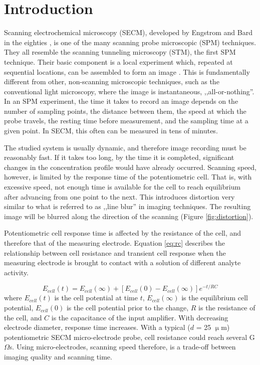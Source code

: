 \documentclass[3p]{elsarticle}
\begin{document}
\section{Introduction}

Scanning electrochemical microscopy (SECM), developed by Engstrom and Bard in the eighties \cite{originalSECM, originalSECM2, originalSECM3}, is one of the many scanning probe microscopic (SPM) techniques. They all resemble the scanning tunneling microscopy (STM), the first SPM technique. Their basic component is a local experiment which, repeated at sequential locations, can be assembled to form an image \cite{stm}. This is fundamentally different from other, non-scanning microscopic techniques, such as the conventional light microscopy, where the image is instantaneous, ,,all-or-nothing''. In an SPM experiment, the time it takes to record an image depends on the number of sampling points, the distance between them, the speed at which the probe travels, the resting time before measurement, and the sampling time at a given point. In SECM, this often can be measured in tens of minutes.

The studied system is usually dynamic, and therefore image recording must be reasonably fast. If it takes too long, by the time it is completed, significant changes in the concentration profile would have already occurred. Scanning speed, however, is limited by the response time of the potentiometric cell. That is, with excessive speed, not enough time is available for the cell to reach equilibrium after advancing from one point to the next. This introduces distortion very similar to what is referred to as ,,line blur'' in imaging techniques. The resulting image will be blurred along the direction of the scanning (Figure \ref{fig:distortion}).

Potentiometric cell response time is affected by the resistance of the cell, and therefore that of the measuring electrode. Equation \ref{eq:rc} describes the relationship between cell resistance and transient cell response when the measuring electrode is brought to contact with a solution of different analyte activity.

\begin{equation}
\label{eq:rc}
	E_{cell}(t) = E_{cell}(\infty) + [E_{cell}(0) - E_{cell}(\infty)]e^{-t/RC}
\end{equation}
where $E_{cell}(t)$ is the cell potential at time $t$, $E_{cell}(\infty)$ is the equilibrium cell potential, $E_{cell}(0)$ is the cell potential prior to the change, $R$ is the resistance of the cell, and $C$ is the capacitance of the input amplifier. With decreasing electrode diameter, response time increases. With a typical ($d$ = 25 $\upmu$m) potentiometric SECM micro-electrode probe, cell resistance could reach several G$\Omega$s. Using micro-electrodes, scanning speed therefore, is a trade-off between imaging quality and scanning time.
\end{document}
